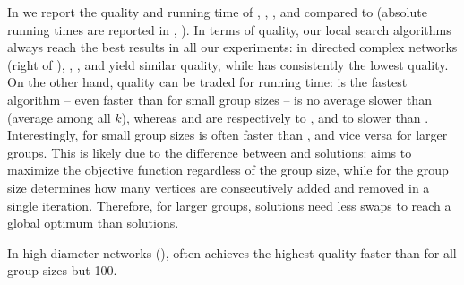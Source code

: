 In  we report the quality and running time of \gslsc,
\greedylsc, \greedyc, and \gs compared to \bestrandomc (absolute running times are
reported in ,
).
%
In terms of quality, our local search algorithms always reach the best results
in all our experiments: in directed complex networks
(right of ), \gslsc, \greedylsc, and \greedyc
yield similar quality, while \gs has consistently the lowest quality.
%
On the other hand, quality can be traded for running time: \gs is the fastest
algorithm -- even faster than \bestrandomc for small group sizes -- \greedyc
is no average \avgSpeedGreedyCplxUnw
slower than \bestrandomc (average among all $k$), whereas \gslsc and
\greedylsc are respectively \minSpeedGSLSCplxUnw to \maxSpeedGSLSCplxUnw, and
\minSpeedGRLSCplxUnw to \maxSpeedGRLSCplxUnw slower than \bestrandomc.
%
Interestingly, for small group sizes \greedylsc is often faster than \gslsc,
and vice versa for larger groups. This is likely due to the difference
between \gs and \greedyc solutions: \greedyc aims to maximize the objective
function regardless of the group size, while for \gs the group size determines
how many vertices are consecutively added and removed in a single iteration.
Therefore, for larger groups, \gs solutions need less swaps to reach a global
optimum than \greedyc solutions.

In high-diameter networks (),
\greedylsc often achieves the
highest quality faster than \gslsc for all group sizes but 100.

